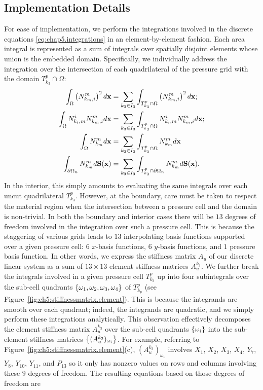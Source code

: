 \subsection{Implementation Details} \label{subsec:chap5.implementation}

For ease of implementation, we perform the integrations involved in the discrete equations \eqref{eq:chap5.integrations} in an element-by-element fashion. Each area integral is represented as a sum of integrals over spatially disjoint elements whose union is the embedded domain. Specifically, we individually address the integration over the intersection of each quadrilateral of the pressure grid with the domain $T^p_{k_3} \cap \Omega$:
\begin{align*}
\int_{\Omega} \left( N^m_{k_m,i} \right)^2 d\mathbf{x} & = \sum_{k_3 \in I_3} \int_{T^p_{k_3} \cap \Omega} \left( N^m_{k_m,i} \right)^2 d\mathbf{x}; \\
\int_{\Omega} N^i_{k_i,m} N^m_{k_m,i} d\mathbf{x} & = \sum_{k_3 \in I_3} \int_{T^p_{k_3} \cap \Omega} N^i_{k_i,m} N^m_{k_m,i} d\mathbf{x}; \\
\int_{\Omega} N^m_{k_m} d\mathbf{x} & = \sum_{k_3 \in I_3} \int_{T^p_{k_3} \cap \Omega} N^m_{k_m} d\mathbf{x} \\
\int_{\partial\Omega_n} N^m_{k_m} d\mathbf{S}(\mathbf{x}) & = \sum_{k_3 \in I_3} \int_{T^p_{k_3} \cap \partial\Omega_n} N^m_{k_m} d\mathbf{S}(\mathbf{x}).
\end{align*}
In the interior, this simply amounts to evaluating the same integrals over each uncut quadrilateral $T^p_{k_3}$. However, at the boundary, care must be taken to respect the material region when the intersection between a pressure cell and the domain is non-trivial. In both the boundary and interior cases there will be $13$ degrees of freedom involved in the integration over such a pressure cell. This is because the staggering of various grids leads to $13$ interpolating basis functions supported over a given pressure cell: $6$ $x$-basis functions, $6$ $y$-basis functions, and $1$ pressure basis function. In other words, we express the stiffness matrix $A_u$ of our discrete linear system as a sum of $13 \times 13$ element stiffness matrices $A_u^{k_3}$. We further break the integrals involved in a given pressure cell $T^p_{k_3}$ up into four subintegrals over the sub-cell quadrants $\left\lbrace \omega_1, \omega_2, \omega_3, \omega_4 \right\rbrace$ of $T^p_{k_p}$ (see Figure~\ref{fig:ch5:stiffnessmatrix.element}). This is because the integrands are smooth over each quadrant; indeed, the integrands are quadratic, and we simply perform these integrations analytically. This observation effectively decomposes the element stiffness matrix $A_u^{k_3}$ over the sub-cell quadrants $\left\lbrace \omega_i \right\rbrace$ into the sub-element stiffness matrices $\left\lbrace (A_u^{k_3})_{\omega_i} \right\rbrace$. For example, referring to Figure~\ref{fig:ch5:stiffnessmatrix.element}(c), $(A_u^{k_3})_{\omega_1}$ involves $X_1$, $X_2$, $X_3$, $X_4$, $Y_7$, $Y_8$, $Y_{10}$, $Y_{11}$, and $P_{13}$ so it only has nonzero values on rows and columns involving these $9$ degrees of freedom. The resulting equations based on those degrees of freedom are
